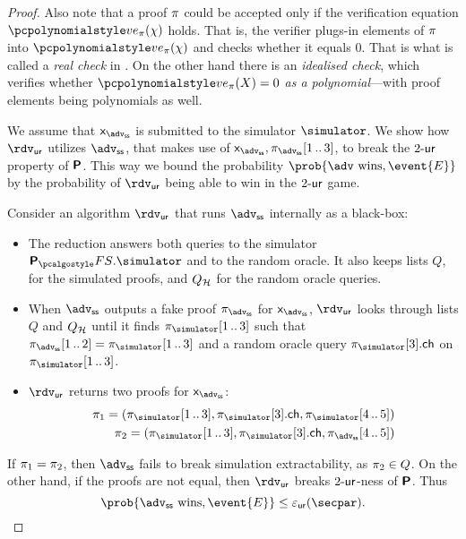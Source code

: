\documentclass[runningheads,11pt]{llncs}
\theoremstyle{definition} \newtheorem{definition}[theorem]{Definition}
\begin{document}
\begin{proof}
  Also note that a proof $\pi$ could be accepted only if the verification
  equation $\vereq_\zkproof(\chi)$ holds. That is, the verifier plugs-in elements of
  $\pi$ into $\vereq_\zkproof(\chi)$ and checks whether it equals $0$. That is what
  is called a \emph{real check} in \cite{EPRINT:GabWilCio19}.  On the other hand
  there is an \emph{idealised check}, which verifies whether $\vereq_\zkproof(X) = 0$
  \emph{as a polynomial}---with proof elements being polynomials as well.

   We assume that $\inp_{\advss}$ is submitted
  to the simulator $\simulator$.  We show how $\rdvur$ utilizes $\advss$, that
  makes use of $\inp_\advss, \zkproof_{\advss}\range{1}{3}$, to break the
  ${2\text{-}\mathsf{ur}}$ property of $\bm{\mathsf{P}}$.  This way we bound the probability
  $\prob{\adv \text{ wins}, \event{E}}$ by the probability of $\rdvur$ being
  able to win in the ${2\text{-}\mathsf{ur}}$ game.

  Consider an algorithm $\rdvur$ that runs $\advss$ internally as a black-box:
  \begin{itemize}
  \item The reduction answers both queries to the simulator
    $\plonkprotfs.\simulator$ and to the random oracle. It also keeps lists $Q$,
    for the simulated proofs, and $Q_{\mathcal{H}}$ for the random oracle queries.
  \item When $\advss$ outputs a fake proof $\zkproof_{\advss}$ for
    $\inp_\advss$, $\rdvur$ looks through lists $Q$ and $Q_{\mathcal{H}}$ until it finds
    $\zkproof_{\simulator}\range{1}{3}$ such that
    $\zkproof_{\advss}\range{1}{2} = \zkproof_{\simulator}\range{1}{3}$ and a
    random oracle query $\zkproof_{\simulator}[3].\ch$ on
    $\zkproof_{\simulator}\range{1}{3}$.
  \item $\rdvur$ returns two proofs for $\inp_\advss$:
    \begin{align*}
      \zkproof_1 = (\zkproof_{\simulator}\range{1}{3}, \zkproof_{\simulator}[3].\ch, \zkproof_{\simulator}\range{4}{5})\\
      \zkproof_2 = (\zkproof_{\simulator}\range{1}{3}, \zkproof_{\simulator}[3].\ch, \zkproof_{\advss}\range{4}{5})
    \end{align*}
  \end{itemize}
  If $\pi_1 = \pi_2$, then $\advss$ fails to break simulation
  extractability, as $\pi_2 \in Q$.  On the other hand, if the proofs are
  not equal, then $\rdvur$ breaks ${2\text{-}\mathsf{ur}}$-ness of $\bm{\mathsf{P}}$. Thus
  \[
    \prob{\advss \text{ wins}, \event{E}} \leq \epsur(\secpar).
  \]


\end{proof}
\end{document}
